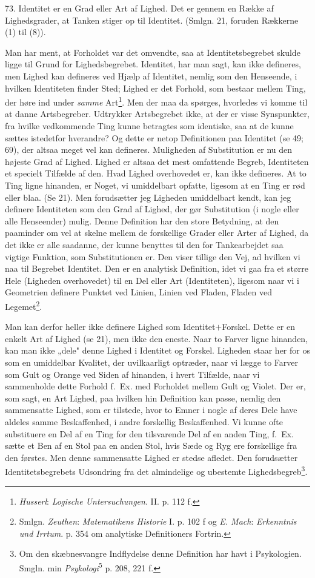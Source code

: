 \documentclass[12pt,a4paper]{book}
\newcommand{\opage}[1]{\marginnote{\footnotesize\textit{[#1]}}}
\begin{document}
73. Identitet er en Grad eller Art af Lighed. Det er gennem en Række af
Lighedsgrader, at Tanken stiger op til Identitet. (Smlgn. 21, foruden
Rækkerne (1) til (8)).

Man har ment, at Forholdet var det omvendte, saa at Identitetsbegrebet
skulde ligge til Grund for Lighedsbegrebet. Identitet, har man sagt,
kan ikke defineres, men Lighed kan defineres ved Hjælp af Identitet,
nemlig som den Henseende, i hvilken Identiteten finder Sted; Lighed er
det Forhold, som bestaar mellem Ting, der høre ind under \emph{samme}
Art\footnote{\emph{Husserl}: \emph{Logische Untersuchungen}. II. p. 112
f.}. Men der maa da spørges, hvorledes vi komme til at danne
Artsbegreber. Udtrykker Artsbegrebet ikke, at der er visse Synspunkter,
fra hvilke vedkommende Ting kunne betragtes som identiske, saa at de
kunne sættes istedetfor hverandre? Og dette er netop Definitionen paa
Identitet (se 49; 69), der altsaa meget vel kan defineres. Muligheden
af Substitution er nu den højeste Grad af Lighed. Lighed er altsaa det
mest omfattende Begreb, Identiteten et specielt Tilfælde af den. Hvad
Lighed overhovedet er, kan ikke defineres. At to Ting ligne hinanden,
er Noget, vi umiddelbart opfatte, ligesom at en Ting er rød eller blaa.
(Se 21). Men forudsætter jeg Ligheden umiddelbart kendt, kan jeg
definere Identiteten som den Grad af Lighed, der gør Substitution (i
nogle eller alle Henseender) mulig. Denne Definition har den store
Betydning, at den paaminder om vel at skelne mellem de forskellige
Grader eller Arter af Lighed, da det ikke er alle saadanne, der kunne
benyttes til den for Tankearbejdet saa vigtige Funktion, som
Substitutionen er. Den viser tillige den Vej, ad hvilken vi naa til
Begrebet Identitet. Den er en analytisk Definition, idet vi gaa fra et
større Hele (Ligheden overhovedet) \opage{178} til en Del eller Art (Identiteten),
ligesom naar vi i Geometrien definere Punktet ved Linien, Linien ved
Fladen, Fladen ved Legemet\footnote{Smlgn. \emph{Zeuthen}:
\emph{Matematikens Historie} I. p. 102 f og \emph{E. Mach}:
\emph{Erkenntnis und Irrtum}. p. 354 om analytiske Definitioners
Fortrin.}.

Man kan derfor heller ikke definere Lighed som Identitet$+$Forskel.
Dette er en enkelt Art af Lighed (se 21), men ikke den eneste. Naar to
Farver ligne hinanden, kan man ikke „dele" denne Lighed i Identitet og
Forskel. Ligheden staar her for os som en umiddelbar Kvalitet, der uvilkaarligt optræder, naar vi lægge to Farver som Gult og Orange ved
Siden af hinanden, i hvert Tilfælde, naar vi sammenholde dette Forhold
f.\ Ex. med Forholdet mellem Gult og Violet. Der er, som sagt, en Art
Lighed, paa hvilken hin Definition kan passe, nemlig den sammensatte
Lighed, som er tilstede, hvor to Emner i nogle af deres Dele have
aldeles samme Beskaffenhed, i andre forskellig Beskaffenhed. Vi kunne
ofte substituere en Del af en Ting for den tilsvarende Del af en anden Ting, f.\ Ex. sætte et Ben af en Stol paa en anden Stol, hvis Sæde og
Ryg ere forskellige fra den førstes. Men denne sammensatte Lighed er
stedse afledet. Den forudsætter Identitetsbegrebets Udsondring fra det
almindelige og ubestemte Lighedsbegreb\footnote{Om den skæbnesvangre
Indflydelse denne Definition har havt i Psykologien. Smgln. min
\emph{Psykologi}\textsuperscript{5} p. 208, 221 f.}.
\end{document}
